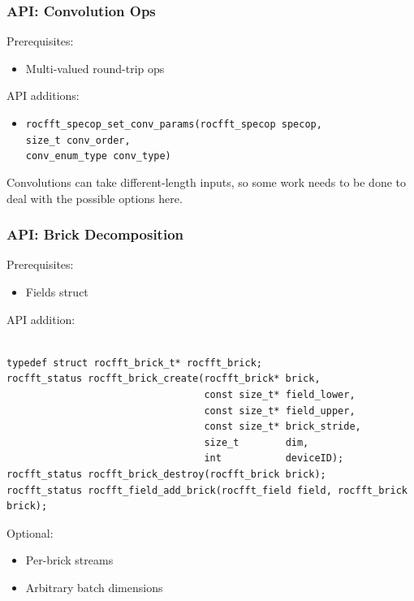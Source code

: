 \documentclass[10pt,aspectratio=169]{beamer}
\begin{document}
\begin{frame}
  \frametitle{API: Convolution Ops}

  Prerequisites:
  \begin{itemize}
  \item Multi-valued round-trip ops
  \end{itemize}

  \medskip
  
  API additions:
  \begin{itemize}
  \item \lstinline{rocfft_specop_set_conv_params(rocfft_specop specop,
                                                          size_t conv_order,
                                                          conv_enum_type conv_type)}
  \end{itemize}

  \medskip

  Convolutions can take different-length inputs, so some work needs to
  be done to deal with the possible options here.
  
  
\end{frame}
  
\begin{frame}[fragile]
  \frametitle{API: Brick Decomposition}

  Prerequisites:
  \begin{itemize}
  \item Fields struct
  \end{itemize}

  \medskip
  
  API addition:
  \begin{lstlisting}

typedef struct rocfft_brick_t* rocfft_brick;
rocfft_status rocfft_brick_create(rocfft_brick* brick,
                                  const size_t* field_lower,
                                  const size_t* field_upper,
                                  const size_t* brick_stride,
                                  size_t        dim,
                                  int           deviceID);
rocfft_status rocfft_brick_destroy(rocfft_brick brick);
rocfft_status rocfft_field_add_brick(rocfft_field field, rocfft_brick brick);
  \end{lstlisting}

  \medskip

  Optional:
  \begin{itemize}
  \item Per-brick streams
  \item Arbitrary batch dimensions
  \end{itemize}
  
  
\end{frame}
\end{document}
